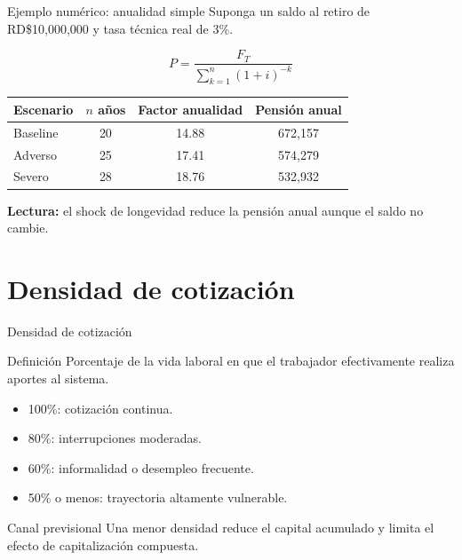 \documentclass[aspectratio=169,11pt]{beamer}
\begin{document}
\begin{frame}{Ejemplo numérico: anualidad simple}
Suponga un saldo al retiro de RD\$10,000,000 y tasa técnica real de 3\%.

\[
P = \frac{F_T}{\sum_{k=1}^{n}(1+i)^{-k}}
\]

\begin{table}
\centering
\begin{tabular}{lccc}
\toprule
Escenario & $n$ años & Factor anualidad & Pensión anual \\
\midrule
Baseline & 20 & 14.88 & 672,157 \\
Adverso & 25 & 17.41 & 574,279 \\
Severo & 28 & 18.76 & 532,932 \\
\bottomrule
\end{tabular}
\end{table}

\textbf{Lectura:} el shock de longevidad reduce la pensión anual aunque el saldo no cambie.
\end{frame}

\section{Densidad de cotización}

\begin{frame}{Densidad de cotización}
\begin{block}{Definición}
Porcentaje de la vida laboral en que el trabajador efectivamente realiza aportes al sistema.
\end{block}

\begin{itemize}
  \item 100\%: cotización continua.
  \item 80\%: interrupciones moderadas.
  \item 60\%: informalidad o desempleo frecuente.
  \item 50\% o menos: trayectoria altamente vulnerable.
\end{itemize}

\begin{alertblock}{Canal previsional}
Una menor densidad reduce el capital acumulado y limita el efecto de capitalización compuesta.
\end{alertblock}
\end{frame}
\end{document}
